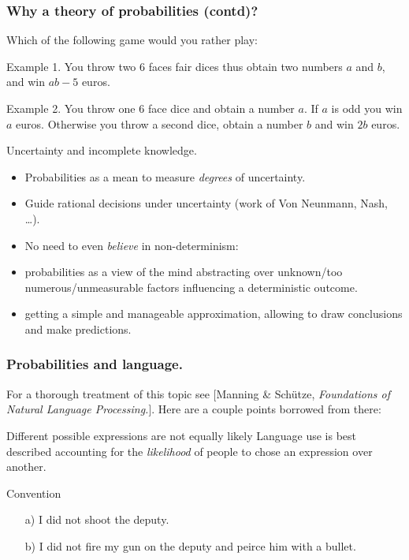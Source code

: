 \documentclass{beamer}
\begin{document}
\begin{frame}
  \frametitle{Why a theory of probabilities (contd)?}
  Which of the following game would you rather play:
  
  \begin{exampleblock}{Example 1.}
    You throw two $6$ faces fair dices thus obtain two numbers $a$ and $b$, and win $ab-5$ euros.
  \end{exampleblock}

  \begin{exampleblock}{Example 2.}
    You throw one $6$ face dice and obtain a number $a$. If $a$ is odd you win $a$ euros. Otherwise you throw a second dice, obtain a number $b$ and win $2b$ euros.
  \end{exampleblock}

\end{frame}

\begin{frame}
  
  \begin{block}{Uncertainty and incomplete knowledge.}
    \begin{itemize}
    \item Probabilities as a mean to measure \emph{degrees} of uncertainty.
    \item Guide rational decisions under uncertainty (work of Von Neunmann, Nash, \dots).
    \item No need to even \emph{believe} in non-determinism:
    \item probabilities as a view of the mind abstracting over unknown/too numerous/unmeasurable factors influencing a deterministic outcome.
    \item getting a simple and manageable approximation, allowing to draw conclusions and make predictions.
    \end{itemize}
  \end{block}
 
\end{frame}

\begin{frame}
  \frametitle{Probabilities and language.}
  For a thorough treatment of this topic see [Manning \& Sch\"utze, \emph{Foundations of Natural Language Processing.}]. Here are a couple points borrowed from there: 

  \begin{block}{Different possible expressions are not equally likely}
    Language use is best described accounting for the \emph{likelihood} of people to chose an expression over another.
  \end{block}

  \begin{exampleblock}{Convention}
    \begin{itemize}
    \item[a)] I did not shoot the deputy.
    \item[b)] I did not fire my gun on the deputy and peirce him with a bullet.
    \end{itemize}
  \end{exampleblock}
\end{frame}
\end{document}
